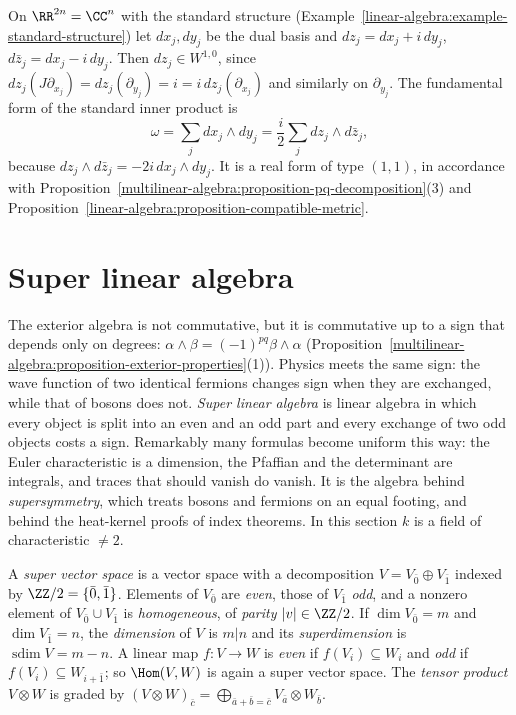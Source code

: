 \begin{example}\label{multilinear-algebra:example-standard-pq}
On $\RR^{2n} = \CC^n$ with the standard structure (Example~\ref{linear-algebra:example-standard-structure}) let
$dx_j, dy_j$ be the dual basis and $dz_j = dx_j + i\,dy_j$, $d\bar z_j = dx_j - i\,dy_j$. Then $dz_j \in W^{1,0}$, since
$dz_j(J\partial_{x_j}) = dz_j(\partial_{y_j}) = i = i\,dz_j(\partial_{x_j})$ and similarly on $\partial_{y_j}$. The fundamental form
of the standard inner product is
\[
\omega = \sum_j dx_j \wedge dy_j = \frac{i}{2}\sum_j dz_j \wedge d\bar z_j,
\]
because $dz_j \wedge d\bar z_j = -2i\,dx_j \wedge dy_j$. It is a real form of type $(1,1)$, in accordance with
Proposition~\ref{multilinear-algebra:proposition-pq-decomposition}(3) and
Proposition~\ref{linear-algebra:proposition-compatible-metric}.
\end{example}

\section{Super linear algebra}\label{multilinear-algebra:section-super}

The exterior algebra is not commutative, but it is commutative up to a sign that depends only on degrees: $\alpha \wedge \beta = (-1)^{pq}\beta \wedge \alpha$
(Proposition~\ref{multilinear-algebra:proposition-exterior-properties}(1)). Physics meets the same sign: the wave function of two identical fermions changes sign when they are exchanged, while that of
bosons does not. \emph{Super linear algebra} is linear algebra in which every object is split into an even and an odd part and every exchange of two odd objects costs a sign. Remarkably many formulas
become uniform this way: the Euler characteristic is a dimension, the Pfaffian and the determinant are integrals, and traces that should vanish do vanish. It is the algebra behind
\emph{supersymmetry}, which treats bosons and fermions on an equal footing, and behind the heat-kernel proofs of index theorems. In this section $k$ is a field of characteristic $\neq 2$.

\begin{definition}\label{multilinear-algebra:definition-super-vector-space}
A \emph{super vector space} is a vector space with a decomposition $V = V_{\bar 0} \oplus V_{\bar 1}$ indexed by $\ZZ/2 = \{\bar 0, \bar 1\}$. Elements of $V_{\bar 0}$ are \emph{even}, those of $V_{\bar 1}$ \emph{odd},
and a nonzero element of $V_{\bar 0} \cup V_{\bar 1}$ is \emph{homogeneous}, of \emph{parity} $|v| \in \ZZ/2$. If $\dim V_{\bar 0} = m$ and $\dim V_{\bar 1} = n$, the \emph{dimension} of $V$ is $m|n$ and its
\emph{superdimension} is $\operatorname{sdim}V = m - n$. A linear map $f \colon V \to W$ is \emph{even} if $f(V_i) \subseteq W_i$ and \emph{odd} if $f(V_i) \subseteq W_{i + \bar 1}$; so $\Hom(V, W)$ is again a super vector space.
The \emph{tensor product} $V \otimes W$ is graded by $(V \otimes W)_{\bar c} = \bigoplus_{\bar a + \bar b = \bar c}V_{\bar a} \otimes W_{\bar b}$.
\end{definition}

